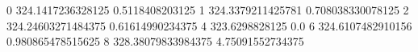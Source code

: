 0 324.1417236328125 0.5118408203125
1 324.3379211425781 0.708038330078125
2 324.24603271484375 0.61614990234375
4 323.6298828125 0.0
6 324.6107482910156 0.980865478515625
8 328.38079833984375 4.75091552734375
